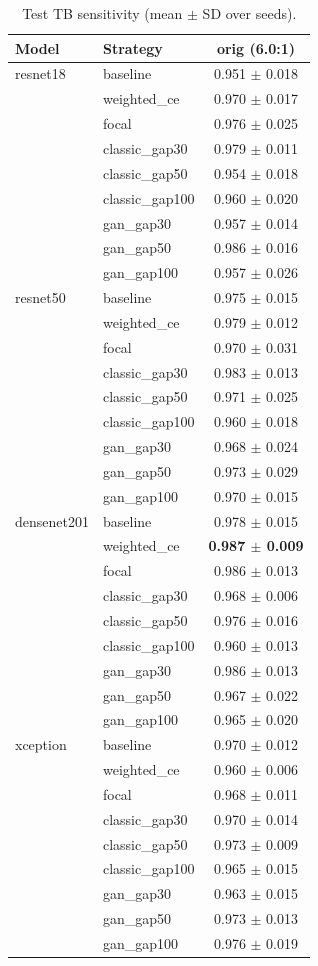 \begin{table}[htbp]
\centering
\caption{Test TB sensitivity (mean $\pm$ SD over seeds).}
\label{tab:tb_recall}
\begin{tabular}{llc}
\toprule
Model & Strategy & orig (6.0:1) \\
\midrule
resnet18 & baseline & 0.951 $\pm$ 0.018 \\
 & weighted\_ce & 0.970 $\pm$ 0.017 \\
 & focal & 0.976 $\pm$ 0.025 \\
 & classic\_gap30 & 0.979 $\pm$ 0.011 \\
 & classic\_gap50 & 0.954 $\pm$ 0.018 \\
 & classic\_gap100 & 0.960 $\pm$ 0.020 \\
 & gan\_gap30 & 0.957 $\pm$ 0.014 \\
 & gan\_gap50 & 0.986 $\pm$ 0.016 \\
 & gan\_gap100 & 0.957 $\pm$ 0.026 \\
\addlinespace
resnet50 & baseline & 0.975 $\pm$ 0.015 \\
 & weighted\_ce & 0.979 $\pm$ 0.012 \\
 & focal & 0.970 $\pm$ 0.031 \\
 & classic\_gap30 & 0.983 $\pm$ 0.013 \\
 & classic\_gap50 & 0.971 $\pm$ 0.025 \\
 & classic\_gap100 & 0.960 $\pm$ 0.018 \\
 & gan\_gap30 & 0.968 $\pm$ 0.024 \\
 & gan\_gap50 & 0.973 $\pm$ 0.029 \\
 & gan\_gap100 & 0.970 $\pm$ 0.015 \\
\addlinespace
densenet201 & baseline & 0.978 $\pm$ 0.015 \\
 & weighted\_ce & \textbf{0.987 $\pm$ 0.009} \\
 & focal & 0.986 $\pm$ 0.013 \\
 & classic\_gap30 & 0.968 $\pm$ 0.006 \\
 & classic\_gap50 & 0.976 $\pm$ 0.016 \\
 & classic\_gap100 & 0.960 $\pm$ 0.013 \\
 & gan\_gap30 & 0.986 $\pm$ 0.013 \\
 & gan\_gap50 & 0.967 $\pm$ 0.022 \\
 & gan\_gap100 & 0.965 $\pm$ 0.020 \\
\addlinespace
xception & baseline & 0.970 $\pm$ 0.012 \\
 & weighted\_ce & 0.960 $\pm$ 0.006 \\
 & focal & 0.968 $\pm$ 0.011 \\
 & classic\_gap30 & 0.970 $\pm$ 0.014 \\
 & classic\_gap50 & 0.973 $\pm$ 0.009 \\
 & classic\_gap100 & 0.965 $\pm$ 0.015 \\
 & gan\_gap30 & 0.963 $\pm$ 0.015 \\
 & gan\_gap50 & 0.973 $\pm$ 0.013 \\
 & gan\_gap100 & 0.976 $\pm$ 0.019 \\
\bottomrule
\end{tabular}
\end{table}